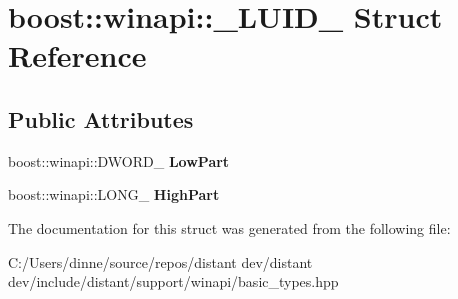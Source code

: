 \hypertarget{structboost_1_1winapi_1_1___l_u_i_d__}{}\section{boost\+:\+:winapi\+:\+:\+\_\+\+L\+U\+I\+D\+\_\+ Struct Reference}
\label{structboost_1_1winapi_1_1___l_u_i_d__}
\subsection*{Public Attributes}
\begin{DoxyCompactItemize}
\item 
\mbox{\label{structboost_1_1winapi_1_1___l_u_i_d___aae3c8f737400723809e7bf23117910f6}} 
boost\+::winapi\+::\+D\+W\+O\+R\+D\+\_\+ {\bfseries Low\+Part}
\item 
\mbox{\label{structboost_1_1winapi_1_1___l_u_i_d___aa6a1adf21f2d980a7ad7efdf76f04704}} 
boost\+::winapi\+::\+L\+O\+N\+G\+\_\+ {\bfseries High\+Part}
\end{DoxyCompactItemize}


The documentation for this struct was generated from the following file\+:\begin{DoxyCompactItemize}
\item 
C\+:/\+Users/dinne/source/repos/distant dev/distant dev/include/distant/support/winapi/basic\+\_\+types.\+hpp\end{DoxyCompactItemize}
